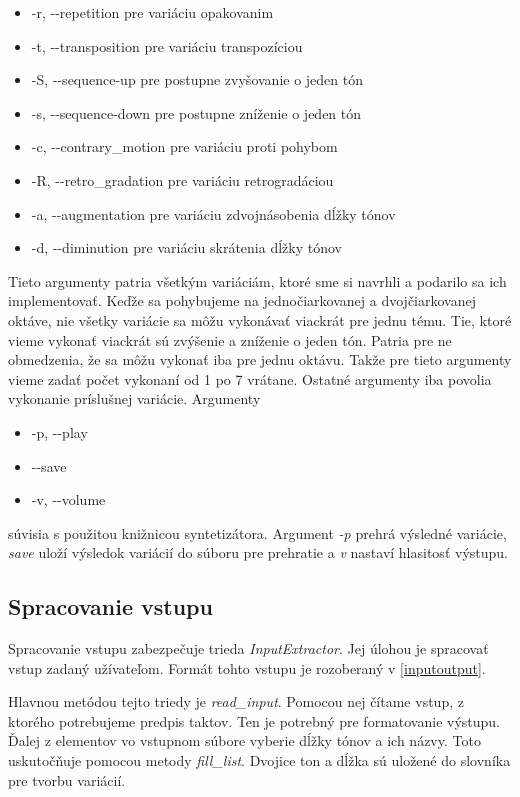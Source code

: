 \begin{itemize}\itemsep0.05em
    \item -r, -{}-repetition pre variáciu opakovanim
    \item -t, -{}-transposition pre variáciu transpozíciou
    \item -S, -{}-sequence-up pre postupne zvyšovanie o jeden tón
    \item -s, -{}-sequence-down pre postupne zníženie o jeden tón
    \item -c, -{}-contrary\_motion pre variáciu proti pohybom
    \item -R, -{}-retro\_gradation pre variáciu retrogradáciou
    \item -a, -{}-augmentation pre variáciu zdvojnásobenia dĺžky tónov
    \item -d, -{}-diminution pre variáciu skrátenia dĺžky tónov
\end{itemize}

Tieto argumenty patria všetkým variáciám, ktoré sme si navrhli a podarilo sa ich implementovať. Keďže sa pohybujeme na jednočiarkovanej a dvojčiarkovanej oktáve, nie všetky variácie sa môžu vykonávať viackrát pre jednu tému. Tie, ktoré vieme vykonať viackrát sú zvýšenie a zníženie o jeden tón. Patria pre ne obmedzenia, že sa môžu vykonať iba pre jednu oktávu. Takže pre tieto argumenty vieme zadať počet vykonaní od 1 po 7 vrátane. Ostatné argumenty iba povolia vykonanie príslušnej variácie. Argumenty

\begin{itemize}\itemsep0.05em
    \item -p, -{}-play 
    \item -{}-save
    \item -v, -{}-volume
\end{itemize}

súvisia s použitou knižnicou syntetizátora. Argument \textit{-p} prehrá výsledné variácie, \textit{save} uloží výsledok variácií do súboru pre prehratie a \textit{v} nastaví hlasitosť výstupu.

\subsection{Spracovanie vstupu}
Spracovanie vstupu zabezpečuje trieda \textit{InputExtractor}. Jej úlohou je spracovať vstup zadaný užívateľom. Formát tohto vstupu je rozoberaný v \ref{inputoutput}. 

Hlavnou metódou tejto triedy je \textit{read\_input}. Pomocou nej čítame vstup, z ktorého potrebujeme predpis taktov. Ten je potrebný pre formatovanie výstupu. Ďalej z elementov vo vstupnom súbore vyberie dĺžky tónov a ich názvy. Toto uskutočňuje pomocou metody \textit{fill\_list}. Dvojice ton a dĺžka sú uložené do slovníka pre tvorbu variácií.

